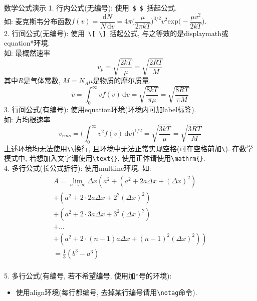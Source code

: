\documentclass[hyperref, UTF8, CJK, aspectratio=169]{beamer}
\begin{document}
\begin{frame}{数学公式演示}
	\alert{1. 行内公式(无编号):} 使用~\verb|$|~\verb|$|~括起公式.\\
	如: 麦克斯韦分布函数$f(v) = \dfrac{\mathrm{d}N}{N\,\mathrm{d}v} = 4\pi \Big(\dfrac{\mu}{2\pi kT}\Big)^{3/2} v^2 \mathrm{exp}\Big(-\dfrac{\mu v^2}{2kT}\Big)$.\\[1ex]
	{\color{univred}2. 行间公式(无编号):} 使用~\verb|\[|~\verb|\]|~括起公式, 与之等效的是displaymath或equation*环境.\\
	如: 最概然速率\[v_p = \sqrt{\dfrac{2kT}{\mu}} = \sqrt{\dfrac{2RT}{M}}\]其中$R$是气体常数, $M = N_A \mu$是物质的摩尔质量.\\[1ex]
		\begin{equation*}
			\bar{v} = \int_0^\infty vf(v)\,\mathrm{d}v = \sqrt{\dfrac{8kT}{\pi\mu}} = \sqrt{\dfrac{8RT}{\pi M}}
		\end{equation*}
	{\color{univred}3. 行间公式(有编号):} 使用equation环境(环境内可加label标签).\\[1ex]
	如: 方均根速率
		\begin{equation}
		v_{rms} = \Big(\int_0^\infty v^2f(v)\,\mathrm{d}v\Big)^{1/2} = \sqrt{\dfrac{3kT}{\mu}} = \sqrt{\dfrac{3RT}{M}}
		\end{equation}
	上述环境均无法使用\verb!\\!换行, 且环境中无法正常实现空格(可在空格前加\verb|\|). 在数学模式中, 若想加入文字请使用\verb|\text|\verb|{}|, 使用正体请使用\verb|\mathrm|\verb|{}|.\\[1ex]
	{\color{univred}4. 多行公式(长公式折行):} 使用multline环境.
	如: 
		\begin{multline}
			A=\lim_{n\rightarrow\infty}\Delta x\left(a^{2}+\left(a^{2}+2a\Delta x+\left(\Delta x\right)^{2}\right)\right.\label{eq:reset}\\
			+\left(a^{2}+2\cdot2a\Delta x+2^{2}\left(\Delta x\right)^{2}\right)\\
			+\left(a^{2}+2\cdot3a\Delta x+3^{2}\left(\Delta x\right)^{2}\right)\\
			+\ldots\\
			\left.+\left(a^{2}+2\cdot(n-1)a\Delta x+(n-1)^{2}\left(\Delta x\right)^{2}\right)\right)\\
			=\frac{1}{3}\left(b^{3}-a^{3}\right)
		\end{multline}\\[1ex]
	\pagebreak
	{\color{univred}5. 多行公式(有编号, 若不希望编号, 使用加*号的环境):}
	\begin{itemize}
		\item 使用align环境(每行都编号, 去掉某行编号请用\verb|\notag|命令).

\end{itemize}
\end{frame}
\end{document}
